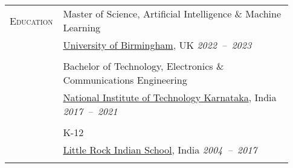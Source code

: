 \documentclass[letterpaper, 10pt, oneside]{article}
\newcommand{\stitle}[1]{\normalsize{\textsc{#1}}}
\begin{document}
\begin{longtable}{@{} p{0.13\linewidth} p{0.8\linewidth}}
    \stitle{Education}                                & {Master of Science, Artificial Intelligence \& Machine Learning}                                                                                                                                      \\
                                                      & \href{https://birmingham.ac.uk}{University of Birmingham}, UK \hfill \textsl{2022\ --\ 2023}                                                                                                          \\
    \\[-1.5ex]
                                                      & {Bachelor of Technology, Electronics \& Communications Engineering}                                                                                                                                   \\
                                                      & \href{https://nitk.ac.in}{National Institute of Technology Karnataka}, India \hfill \hspace{-3em} \textsl{2017\ --\ 2021}                                                                             \\
    \\[-1.5ex]
                                                      & {K-12}                                                                                                                                                                                                \\
                                                      & \href{https://littlerock.edu.in}{Little Rock Indian School}, India \hfill \textsl{2004\ --\ 2017}                                                                                                     \\
    \\



\end{longtable}
\end{document}
